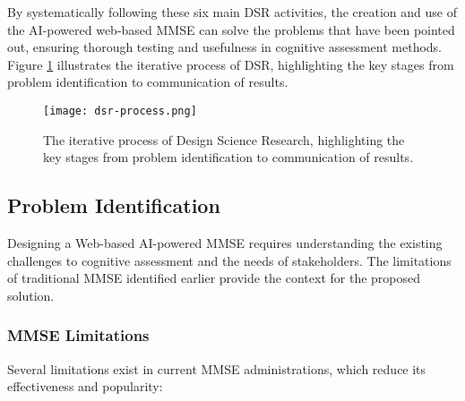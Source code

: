 By systematically following these six main DSR activities, the creation and use of the AI-powered web-based MMSE can solve the problems that have been pointed out, ensuring thorough testing and usefulness in cognitive assessment methods. Figure \ref{fig:dsr-process} illustrates the iterative process of DSR, highlighting the key stages from problem identification to communication of results.

\begin{figure}[h!]
\begin{center}
\texttt{[image: dsr-process.png]}
\caption{The iterative process of Design Science Research, highlighting the key stages from problem identification to communication of results.}
\label{fig:dsr-process}
\end{center}
\end{figure}

\subsection{Problem Identification}

Designing a Web-based AI-powered MMSE requires understanding the existing challenges to cognitive assessment and the needs of stakeholders. The limitations of traditional MMSE identified earlier provide the context for the proposed solution.

\subsubsection{MMSE Limitations}

Several limitations exist in current MMSE administrations, which reduce its effectiveness and popularity:

